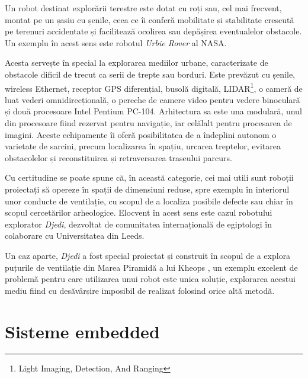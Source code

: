 Un robot destinat explorării terestre este dotat cu roți sau, cel mai frecvent, montat pe un șasiu cu șenile, ceea ce îi conferă mobilitate și stabilitate crescută pe terenuri accidentate și facilitează ocolirea sau depășirea eventualelor obstacole. Un exemplu în acest sens este robotul \textit{Urbie Rover} al NASA.


Acesta servește în special la explorarea mediilor urbane, caracterizate de obstacole dificil de trecut ca serii de trepte sau borduri. Este prevăzut cu șenile, wireless Ethernet, receptor GPS diferențial, busolă digitală, LIDAR\footnote{Light Imaging, Detection, And Ranging}, o cameră de luat vederi omnidirecțională, o pereche de camere video pentru vedere binoculară și două procesoare Intel Pentium PC-104. Arhitectura sa este una modulară, unul din procesoare fiind rezervat pentru navigație, iar celălalt pentru procesarea de imagini. Aceste echipamente îi oferă posibilitatea de a îndeplini autonom o varietate de sarcini, precum localizarea în spațiu, urcarea treptelor, evitarea obstacolelor și reconstituirea și retraversarea traseului parcurs.

Cu certitudine se poate spune că, în această categorie, cei mai utili sunt roboții proiectați să opereze în spații de dimensiuni reduse, spre exemplu în interiorul unor conducte de ventilație, cu scopul de a localiza posibile defecte sau chiar în scopul cercetărilor arheologice. Elocvent în acest sens este cazul robotului explorator \textit{Djedi}, dezvoltat de comunitatea internațională de egiptologi în colaborare cu Universitatea din Leeds.


Un caz aparte, \textit{Djedi} a fost special proiectat și construit în scopul de a explora puțurile de ventilație din Marea Piramidă a lui Kheops \cite{djedi}, un exemplu excelent de problemă pentru care utilizarea unui robot este unica soluție, explorarea acestui mediu fiind cu desăvârșire imposibil de realizat folosind orice altă metodă.


\section{Sisteme embedded}

